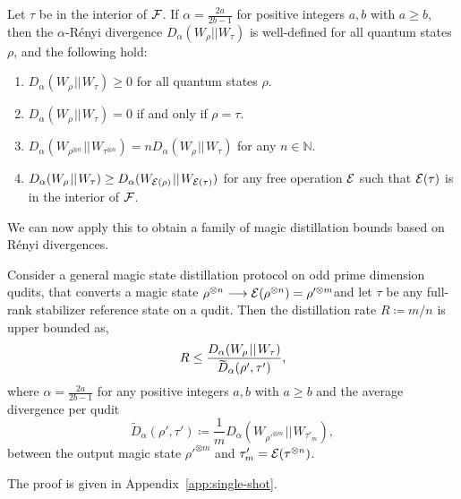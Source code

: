 \documentclass[pra,
aps,
twocolumn,
superscriptaddress,
groupedaddress,
nofootinbib,
reprint
]{revtex4-1}
\begin{document}
\begin{theorem}\label{thm:Da_props} 
	Let $\tau$ be in the interior of ${\mathcal F}$. 
	If $\alpha = \frac{2a}{2b-1}$ for positive integers $a,b$ with $a \geq b$, then the $\alpha$-R\'{e}nyi divergence $D_\alpha(W_\rho || W_\tau)$ is well-defined for all quantum states $\rho$, and the following hold:
\begin{enumerate}
\item $D_\alpha(W_\rho \hspace{1pt}||\hspace{1pt} W_\tau) \ge 0$ for all quantum states $\rho$.
\item  $D_\alpha(W_\rho \hspace{1pt}||\hspace{1pt} W_\tau) = 0$ if and only if $\rho =\tau$.
\item $D_\alpha(W_{\rho^{\otimes n}} \hspace{1pt}||\hspace{1pt} W_{\tau^{\otimes n}}) = n D_\alpha(W_\rho \hspace{1pt}||\hspace{1pt} W_\tau)$ for any $n \in \mathbb{N}$.
\item $D_\alpha(W_\rho \hspace{1pt}||\hspace{1pt} W_\tau) \geq D_\alpha (W_{{\mathcal E}(\rho)} \hspace{1pt}||\hspace{1pt} W_{{\mathcal E}(\tau)})$ for any free operation ${\mathcal E}$ such that ${\mathcal E}(\tau)$ is in the interior of ${\mathcal F}$.
\end{enumerate}
\end{theorem}

We can now apply this to obtain a family of magic distillation bounds based on R\'{e}nyi divergences.

\begin{theorem}\label{thm:entropic_bounds}
	Consider a general magic state distillation protocol on odd prime dimension qudits, that converts a magic state $\rho^{\otimes n} \longrightarrow {\mathcal E}(\rho^{\otimes n})=\rho'^{\otimes m}$and let $\tau$ be any full-rank stabilizer reference state on a qudit. Then the distillation rate $R \coloneqq m/n$ is upper bounded as,
	\begin{equation}
		R \leq \frac{D_{\alpha}(W_\rho \hspace{1pt}||\hspace{1pt} W_\tau)}{\rlap{\raisebox{-0.2ex}{$\widetilde{\phantom{D}}$}}D_\alpha( \rho', \tau')},
	\end{equation}
	where $\alpha = \frac{2a}{2b-1}$ for any positive integers $a,b$ with $a \geq b$ and the average divergence per qudit
	\begin{equation}
\widetilde{D}_\alpha( \rho', \tau') \coloneqq \frac{1}{m} D_\alpha (W_{\rho'^{\otimes m}} \hspace{1pt}||\hspace{1pt} W_{\tau'_m}),
\end{equation}
between the output magic state $\rho'^{\otimes m}$ and $\tau'_m = {\mathcal E}(\tau^{\otimes n})$.
\end{theorem}
The proof is given in Appendix~\ref{app:single-shot}. 
\end{document}
